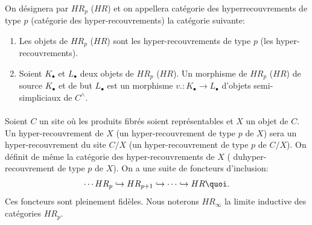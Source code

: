 \paragraph{}
On désignera par $HR_p$ (\resp $HR$) et on appellera catégorie
des hyperrecouvrements de type $p$ (\resp catégorie des
hyper-recouvrements) la catégorie suivante:
\begin{enumerate}
\renewcommand{\theenumi}{\alph {enumi}}
\renewcommand{\labelenumi}{\theenumi)}
\item Les objets de $HR_p$ (\resp $HR$) sont les hyper-recouvrements
  de type $p$ (\resp les hyper-recouvrements).

\item Soient $K_∙$ et $L_∙$ deux objets de $HR_p$ (\resp $HR$). Un
  morphisme de $HR_p$ (\resp $HR$) de source $K_∙$ et de but $L_∙$ est
  un morphisme $v. : K_∙ \to L_∙$ d'objets semi-simpliciaux de
  $C^{\wedge}$.
\end{enumerate}

\paragraph{}
Soient $C$ un site où les produits fibrés soient représentables
et $X$ un objet de $C$. Un hyper-recouvrement de $X$ (\resp un
hyper-recouvrement de type $p$ de $X$) sera un hyper-recouvrement du
site $C/X$ (\resp un hyper-recouvrement de type $p$ de $C/X$). On
définit de même la catégorie des hyper-recouvrements de $X$ (\resp
du\pageoriginale hyper-recouvrement de type $p$ de $X$). On a une
suite de foncteurs d'inclusion:
$$
\cdots HR_p \hookrightarrow HR_{p + 1} \hookrightarrow \cdots
\hookrightarrow HR{\quoi}.
$$
Ces foncteurs sont pleinement fidèles. Nous noterons $HR_{\infty}$
la limite inductive des catégories $HR_p$.

\setcounter{paragraph}{5}
